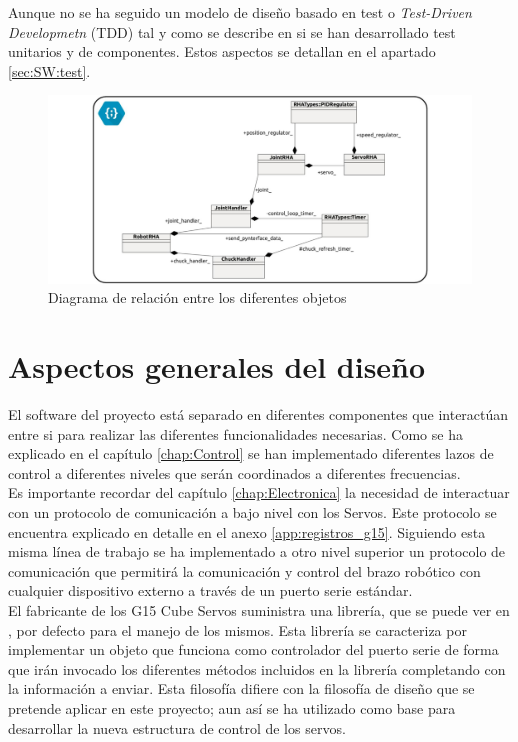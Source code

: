 Aunque no se ha seguido un modelo de diseño basado en test o \textit{Test-Driven Developmetn} (TDD) tal y como se describe en \cite{tdd:2005} si se han desarrollado test unitarios y de componentes. Estos aspectos se detallan en el apartado \ref{sec:SW:test}.
     \begin{figure}[H]
     	\centering
     	\includegraphics[width=1\textwidth]{figuras/Imagenes_SW/diagrama_clases_general.jpg}
     	\caption{Diagrama de relación entre los diferentes objetos}
     	\label{fig:SW:class_diagram_all}
     \end{figure}

\section{Aspectos generales del diseño} \label{sec:SW:diseno_general}

El software del proyecto está separado en diferentes componentes que interactúan entre si para realizar las diferentes funcionalidades necesarias. Como se ha explicado en el capítulo \ref{chap:Control} se han implementado diferentes lazos de control a diferentes niveles que serán coordinados a diferentes frecuencias.
\\

Es importante recordar del capítulo \ref{chap:Electronica} la necesidad de interactuar con un protocolo de comunicación a bajo nivel con los Servos. Este protocolo se encuentra explicado en detalle en el anexo \ref{app:registros_g15}. Siguiendo esta misma línea de trabajo se ha implementado a otro nivel superior un protocolo de comunicación que permitirá la comunicación y control del brazo robótico con cualquier dispositivo externo a través de un puerto serie estándar.
\\

El fabricante de los G15 Cube Servos suministra una librería, que se puede ver en \cite{g15lib}, por defecto para el manejo de los mismos. Esta librería se caracteriza por implementar un objeto que funciona como controlador del puerto serie de forma que irán invocado los diferentes métodos incluidos en la librería completando con la información a enviar. Esta filosofía difiere con la filosofía de diseño que se pretende aplicar en este proyecto; aun así se ha utilizado como base para desarrollar la nueva estructura de control de los servos.
\\

